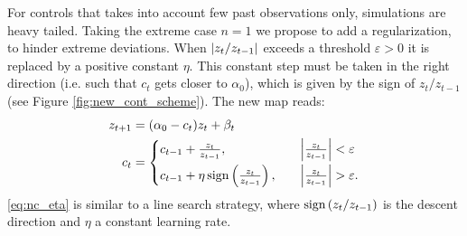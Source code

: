 \documentclass[FinalReport.tex]{subfiles}
\begin{document}
For controls that takes into account few past observations only, simulations are heavy tailed. Taking the extreme case $n=1$ we propose to add a regularization, to hinder extreme deviations. When $\abs{z_t/z_{t-1}}$ exceeds a threshold $\varepsilon>0$ it is replaced by a positive constant $\eta$. This constant step must be taken in the right direction (i.e. such that $c_t$ gets closer to $\alpha_0$), which is given by the sign of $z_t/z_{t-1}$ (see Figure \ref{fig:new_cont_scheme}). The new map reads:
\begin{subequations}
\begin{align}	
	z_{t+1}&=(\alpha_0-c_t)z_t+\beta_t\\
	c_t&=
\begin{cases}\label{eq:nc_eta}
	c_{t-1}+\frac{z_t}{z_{t-1}},\quad &\abs{\frac{z_t}{z_{t-1}} }<\varepsilon\vspace{.1cm} \\ 
	c_{t-1}+\eta\,\sign{\frac{z_t}{z_{t-1}}},\quad &\abs{\frac{z_t}{z_{t-1}} }>\varepsilon .
\end{cases}
\end{align}
\label{eq:nc}
\end{subequations}
\eqref{eq:nc_eta} is similar to a line search strategy, where $\text{sign}\left(z_t/z_{t-1}\right)$ is the descent direction and $\eta$ a constant learning rate.
\end{document}
